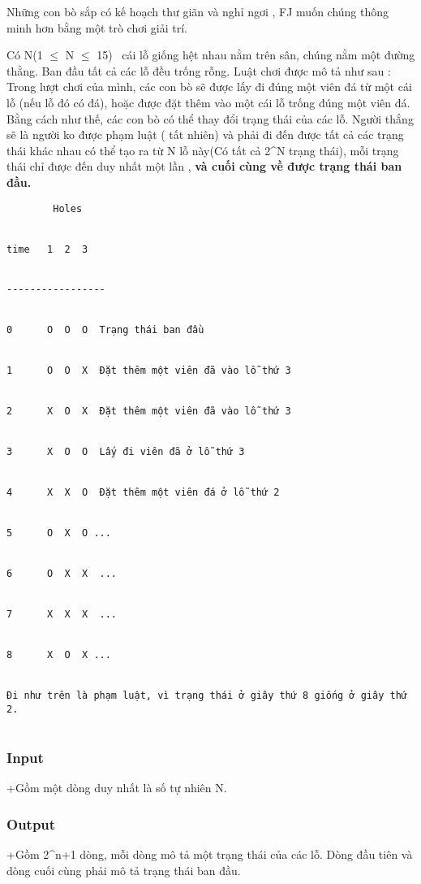 



   Những con bò sắp có kế hoạch thư giãn và nghỉ ngơi , FJ muốn chúng thông minh hơn bằng một trò chơi giải trí.  

   Có N(1 $\le$ N $\le$ 15)  cái lỗ giống hệt nhau nằm trên sân, chúng nằm một đường thằng. Ban đầu tất cả các lỗ đều trống rỗng. Luật chơi được mô tả như sau : Trong lượt chơi của mình, các con bò sẽ được lấy đi đúng một viên đá từ một cái lỗ (nếu lỗ đó có đá), hoặc được đặt thêm vào một cái lỗ trống đúng một viên đá. Bằng cách như thế, các con bò có thể thay đổi trạng thái của các lỗ. Người thắng sẽ là người ko được phạm luật ( tất nhiên) và phải đi đến được tất cả các trạng thái khác nhau có thể tạo ra từ N lỗ này(Có tất cả 2^N trạng thái), mỗi trạng thái chỉ được đến duy nhất một lần ,   \textbf{    và cuối cùng về được trạng thái ban đầu.   }
\begin{verbatim}
        Holes


time   1  2  3 


-----------------


0      O  O  O  Trạng thái ban đầu


1      O  O  X  Đặt thêm một viên đã vào lỗ thứ 3


2      X  O  X  Đặt thêm một viên đã vào lỗ thứ 3


3      X  O  O  Lấy đi viên đã ở lỗ thứ 3


4      X  X  O  Đặt thêm một viên đá ở lỗ thứ 2


5      O  X  O ...


6      O  X  X  ...


7      X  X  X  ...


8      X  O  X ...


Đi như trên là phạm luật, vì trạng thái ở giây thứ 8 giống ở giây thứ 2.


\end{verbatim}

\subsubsection{   Input  }

   +Gồm một dòng duy nhất là số tự nhiên N.  

\subsubsection{   Output  }

   +Gồm 2^n+1 dòng, mỗi dòng mô tả một trạng thái của các lỗ. Dòng đầu tiên và dòng cuối cùng phải mô tả trạng thái ban đầu.  

